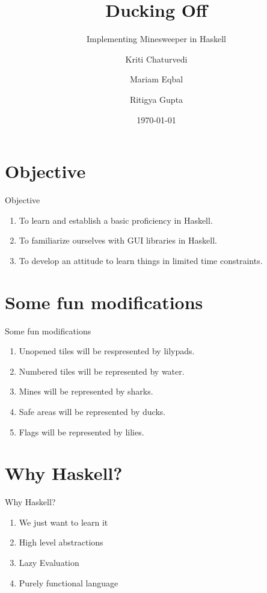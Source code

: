 \documentclass{beamer}
\title{Ducking Off}
\subtitle{Implementing Minesweeper in Haskell}
\author{Kriti Chaturvedi \and Mariam Eqbal \and Ritigya Gupta}
\date{\today}
\begin{document}
\begin{frame}
    \titlepage 
\end{frame}

\section{Objective}
\begin{frame}{Objective}
    \begin{enumerate}
        \item To learn and establish a basic proficiency in Haskell.
        \item To familiarize ourselves with GUI libraries in Haskell.
        \item To develop an attitude to learn things in limited time constraints.
    \end{enumerate}
\end{frame}

\section{Some fun modifications}
\begin{frame}{Some fun modifications}
    \begin{enumerate}
        \item Unopened tiles will be respresented by lilypads. 
        \item Numbered tiles will be represented by water.
        \item Mines will be represented by sharks.
        \item Safe areas will be represented by ducks. 
        \item Flags will be represented by lilies.
    \end{enumerate}
\end{frame}

\section{Why Haskell?}
\begin{frame}{Why Haskell?}
    \begin{enumerate}
        \item We just want to learn it
        \item High level abstractions
        \item Lazy Evaluation
        \item Purely functional language
    \end{enumerate}
    \end{frame}
\end{document}
